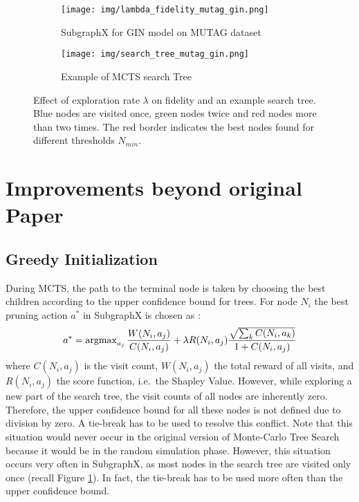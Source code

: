 \begin{figure}[ht]
  \begin{subfigure}{0.5\textwidth}
    \texttt{[image: img/lambda\_fidelity\_mutag\_gin.png]}
    \caption{SubgraphX for GIN model on MUTAG dataset}
  \end{subfigure}%
  \hspace*{\fill}   %
  \begin{subfigure}{0.5\textwidth}
    \texttt{[image: img/search\_tree\_mutag\_gin.png]}
    \caption{Example of MCTS search Tree}
    \label{fig:lambda_tree}
  \end{subfigure}%
\caption{Effect of exploration rate $\lambda$ on fidelity and an example search tree. Blue nodes are visited once, green nodes twice and red nodes more than two times. The red border indicates the best nodes found for different thresholds $N_{min}$.}
\label{fig:lambda}
\end{figure}




\section{Improvements beyond original Paper}
\label{sec:improvements}

\subsection{Greedy Initialization}
\label{subsec:greedy}
During MCTS, the path to the terminal node is taken by choosing the best children according to the upper confidence bound for trees. 
For node $N_i$ the best pruning action $a^*$ in SubgraphX is chosen as \cite{Yuan21}: 
\begin{equation}
\label{eq:ucb}
    \centering
    a^* = \operatorname{argmax}_{a_j} \frac{W(N_i, a_j)}{C(N_i, a_j)} + \lambda R(N_i, a_j) \frac{\sqrt{\sum_k C(N_i, a_k)}}{1 + C(N_i, a_j)}
\end{equation}
where $C(N_i, a_j)$ is the visit count, $W(N_i, a_j)$ the total reward of all visits, and $R(N_i, a_j)$ the score function, i.e.\ the Shapley Value. 
However, while exploring a new part of the search tree, the visit counts of all nodes are inherently zero. 
Therefore, the upper confidence bound for all these nodes is not defined due to division by zero.
A tie-break has to be used to resolve this conflict.
Note that this situation would never occur in the original version of Monte-Carlo Tree Search because it would be in the random simulation phase. 
However, this situation occurs very often in SubgraphX, as most nodes in the search tree are visited only once (recall Figure \ref{fig:lambda_tree}). 
In fact, the tie-break has to be used more often than the upper confidence bound.

